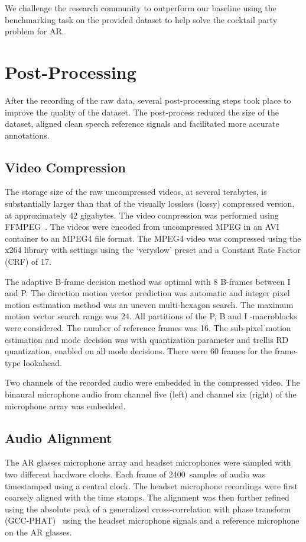 \documentclass[journal]{IEEEtran}
\begin{document}
We challenge the research community to outperform our baseline using the benchmarking task on the provided dataset to help solve the cocktail party problem for AR.


 

\appendices

\section{Post-Processing} \label{appx:PostProcessing}

After the recording of the raw data, several post-processing steps took place to improve the quality of the dataset.
The post-process reduced the size of the dataset, aligned clean speech reference signals and facilitated more accurate annotations.

\subsection{Video Compression} \label{sec:video_compression}
The storage size of the raw uncompressed videos, at several terabytes, is substantially larger than that of the visually lossless (lossy) compressed version, at approximately 42 gigabytes.
The video compression was performed using FFMPEG~\cite{}.
The videos were encoded from uncompressed MPEG in an AVI container to an MPEG4 file format.
The MPEG4 video was compressed using the x264 library with settings using the `veryslow' preset and a Constant Rate Factor (CRF) of 17.

The adaptive B-frame decision method was optimal with 8 B-frames between I and P.
The direction motion vector prediction was automatic and integer pixel motion estimation method was an uneven multi-hexagon search.
The maximum motion vector search range was 24.
All partitions of the P, B and I -macroblocks were considered.
The number of reference frames was 16.
The sub-pixel motion estimation and mode decision was with quantization parameter and trellis RD quantization, enabled on all mode decisions.
There were 60 frames for the frame-type lookahead.

Two channels of the recorded audio were embedded in the compressed video.
The binaural microphone audio from channel five (left) and channel six (right) of the microphone array was embedded.


\subsection{Audio Alignment} \label{sec:audio_alignment}
The AR glasses microphone array and headset microphones were sampled with two different hardware clocks.
Each frame of \SI{2400}{samples} of audio was timestamped using a central clock.
The headset microphone recordings were first coarsely aligned with the time stamps.
The alignment was then further refined using the absolute peak of a generalized cross-correlation with phase transform (GCC-PHAT)~\cite{1162830} using the headset microphone signals and a reference microphone on the AR glasses.
\end{document}
